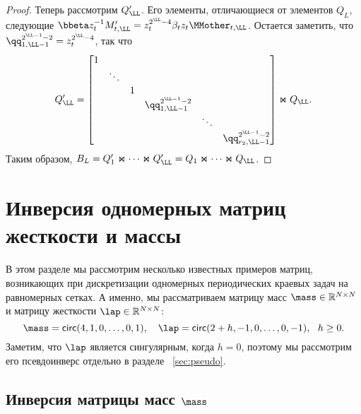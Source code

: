 \begin{proof}
	Теперь рассмотрим $Q_{\LL}'$.
	Его элементы, отличающиеся от элементов $Q_L$, следующие
	$\bbeta z_t^{-1} M'_{t,\LL} = z_t^{2^\LL-4} \beta_t z_t \MMother_{t,\LL}$.
	Остается заметить, что $\qq_{1,\LL-1}^{2^{\LL-1}-2} = z_t^{2^\LL-4}$, так что
	\[
	Q_{\LL}' = 
	\begin{bmatrix}
	1 &        &   &                         &        & \\
	& \ddots &   &                         &        & \\
	&        & 1 &                         &        & \\
	&        &   & \qq_{1,\LL-1}^{2^{\LL-1}-2}             &        & \\
	&        &   &                         & \ddots & \\
	&        &   &                         &        & \qq_{r_2,\LL-1}^{2^{\LL-1}-2}
	\end{bmatrix}
	\Join
	Q_{\LL}.
	\]
	Таким образом, $B_L = Q_1'\Join \dots \Join Q_{\LL}' = Q_1 \Join \dots \Join Q_{\LL}$.
\end{proof}







\section{Инверсия одномерных матриц жесткости и массы} \label{sec:examples}

В этом разделе мы рассмотрим несколько известных примеров матриц, возникающих при дискретизации одномерных периодических краевых задач на равномерных сетках.
А именно, мы рассматриваем матрицу масс $\mass\in \mathbb{R}^{N \times N}$ и матрицу жесткости $\lap\in \mathbb{R}^{N \times N}$:
\[
\mass = \mathsf{circ}(4,1,0,\dots,0,1), \quad\lap = \mathsf{circ}(2+h,-1,0,\dots,0,-1),~~h \geq 0.
\]
Заметим, что $\lap$ является сингулярным, когда $h=0$, поэтому мы рассмотрим его псевдоинверс отдельно в разделе ~\ref{sec:pseudo}.

\subsection{Инверсия матрицы масс $\mass$}


